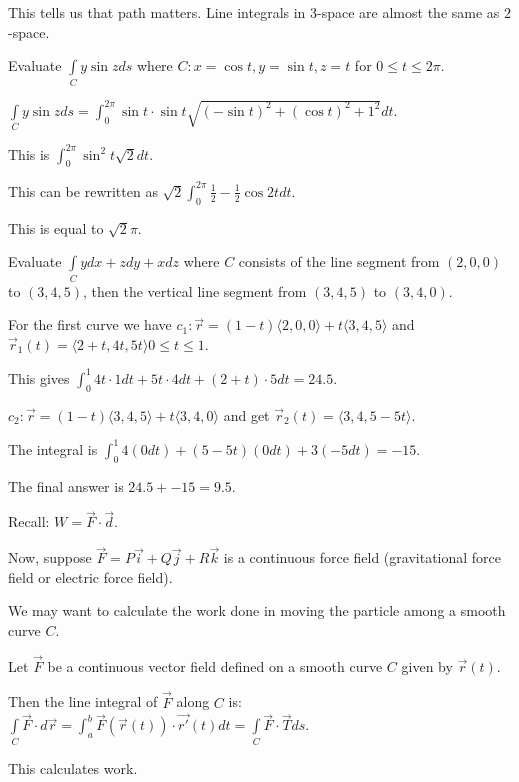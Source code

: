 \documentclass[../calc3.tex]{subfiles}
\begin{document}
This tells us that path matters. Line integrals in $3$-space are almost the same as $2$-space.

\begin{example}
    Evaluate $\int\limits_{C}y\sin zds$ where $C:x=\cos t, y=\sin t, z=t$ for $0\leq t\leq 2\pi$.

    $\int\limits_{C} y\sin zds = \int_0^{2\pi}\sin t\cdot \sin t\sqrt{(-\sin t)^2+(\cos t)^2+1^2}dt$.

    This is $\int_0^{2\pi}\sin^2 t\sqrt{2}dt$.

    This can be rewritten as $\sqrt{2}\int_0^{2\pi}\frac{1}{2}-\frac{1}{2}\cos 2t dt$.

    This is equal to $\sqrt{2}\pi$.
\end{example}

\begin{example}
    Evaluate $\int\limits_{C}ydx+zdy+xdz$ where $C$ consists of the line segment from $(2,0,0)$ to $(3,4,5)$, then the vertical line segment from $(3,4,5)$ to $(3,4,0)$.

    For the first curve we have $c_1: \vec{r}=(1-t)\langle 2,0,0\rangle + t\langle 3,4,5\rangle$ and $\vec{r}_1(t)=\langle 2+t,4t,5t\rangle 0\leq t\leq 1$.

    This gives $\int_0^1 4t\cdot 1 dt + 5t\cdot 4dt + (2+t)\cdot 5 dt = 24.5$.

    $c_2: \vec{r}=(1-t)\langle 3,4,5\rangle + t\langle 3,4,0\rangle$ and get $\vec{r}_2(t)=\langle 3,4,5-5t\rangle$.

    The integral is $\int_0^1 4(0dt)+(5-5t)(0dt)+3(-5dt) = -15$.

    The final answer is $24.5+-15 = 9.5$.
\end{example}

Recall: $W=\vec{F}\cdot \vec{d}$.

Now, suppose $\vec{F}=P\vec{i}+Q\vec{j}+R\vec{k}$ is a continuous force field (gravitational force field or electric force field).

We may want to calculate the work done in moving the particle among a smooth curve $C$.

\begin{definition}
    Let $\vec{F}$ be a continuous vector field defined on a smooth curve $C$ given by $\vec{r}(t)$.

    Then the line integral of $\vec{F}$ along $C$ is: $\int\limits_{C}\vec{F}\cdot d\vec{r}=\int_a^b \vec{F}(\vec{r}(t))\cdot \vec{r'}(t)dt = \int\limits_{C}\vec{F}\cdot \vec{T}ds$.

    This calculates work.
\end{definition}
\end{document}
